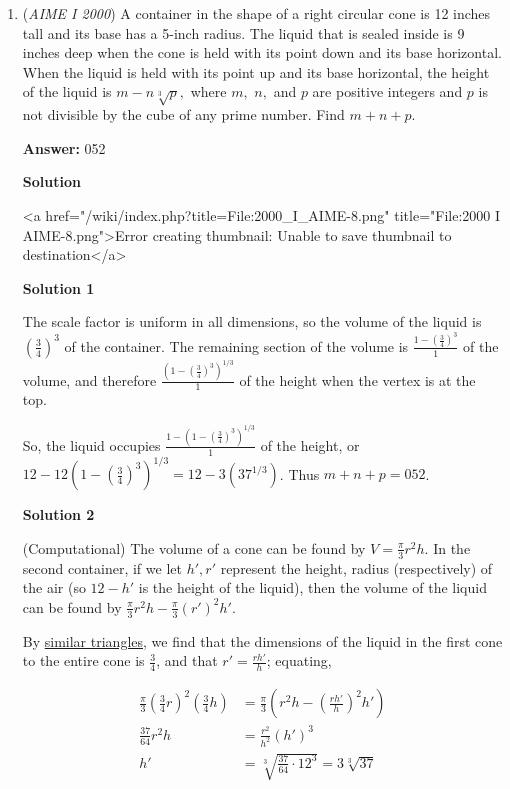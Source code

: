 \begin{enumerate}
	\item (\textit{AIME I 2000}) A container in the shape of a right circular cone is 12 inches tall and its base has a 5-inch radius. The liquid that is sealed inside is 9 inches deep when the cone is held with its point down and its base horizontal. When the liquid is held with its point up and its base horizontal, the height of the liquid is $m - n\sqrt [3]{p},$ where $m,$ $n,$ and $p$ are positive integers and $p$ is not divisible by the cube of any prime number. Find $m + n + p$.


 
 \textbf{Answer: }052



\textbf{Solution}

<a href="/wiki/index.php?title=File:2000\_I\_AIME-8.png" title="File:2000 I AIME-8.png">Error creating thumbnail: Unable to save thumbnail to destination</a>




\textbf{Solution 1}

The scale factor is uniform in all dimensions, so the volume of the liquid is $\left(\frac{3}{4}\right)^{3}$ of the container. The remaining section of the volume is $\frac{1-\left(\frac{3}{4}\right)^{3}}{1}$ of the volume, and therefore $\frac{\left(1-\left(\frac{3}{4}\right)^{3}\right)^{1/3}}{1}$ of the height when the vertex is at the top.

 So, the liquid occupies $\frac{1-\left(1-\left(\frac{3}{4}\right)^{3}\right)^{1/3}}{1}$ of the height, or $12-12\left(1-\left(\frac{3}{4}\right)^{3}\right)^{1/3}=12-3\left(37^{1/3}\right)$. Thus $m+n+p=\boxed{052}$.

 



\textbf{Solution 2}

(Computational) The volume of a cone can be found by $V = \frac{\pi}{3}r^2h$. In the second container, if we let $h',r'$ represent the height, radius (respectively) of the air (so $12 -h'$ is the height of the liquid), then the volume of the liquid can be found by $\frac{\pi}{3}r^2h - \frac{\pi}{3}(r')^2h'$. 

 By \href{https://artofproblemsolving.com/wiki/index.php?title=Similar\_triangle&action=edit&redlink=1}{similar triangles}, we find that the dimensions of the liquid in the first cone to the entire cone is $\frac{3}{4}$, and that $r' = \frac{rh'}{h}$; equating,

 
 \begin{align*}\frac{\pi}{3}\left(\frac{3}{4}r\right)^2 \left(\frac{3}{4}h\right) &= \frac{\pi}{3}\left(r^2h - \left(\frac{rh'}{h}\right)^2h'\right)\\ \frac{37}{64}r^2h &= \frac{r^2}{h^2}(h')^3 \\ h' &= \sqrt[3]{\frac{37}{64} \cdot 12^3} = 3\sqrt[3]{37}\end{align*}



\end{enumerate}
